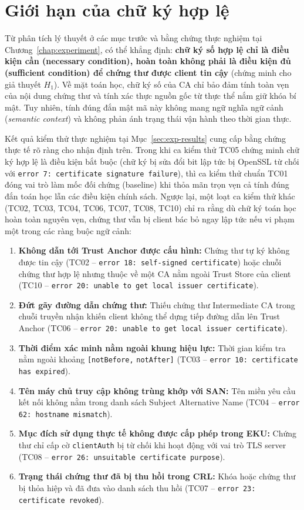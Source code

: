 \section{Giới hạn của chữ ký hợp lệ}
\label{sec:valid-signature-limits}

Từ phân tích lý thuyết ở các mục trước và bằng chứng thực nghiệm tại Chương~\ref{chap:experiment}, có thể khẳng định: \textbf{chữ ký số hợp lệ chỉ là điều kiện cần (necessary condition), hoàn toàn không phải là điều kiện đủ (sufficient condition) để chứng thư được client tin cậy} (chứng minh cho giả thuyết $H_1$). Về mặt toán học, chữ ký số của CA chỉ bảo đảm tính toàn vẹn của nội dung chứng thư và tính xác thực nguồn gốc từ thực thể nắm giữ khóa bí mật. Tuy nhiên, tính đúng đắn mật mã này không mang ngữ nghĩa ngữ cảnh (\textit{semantic context}) và không phản ánh trạng thái vận hành theo thời gian thực.

Kết quả kiểm thử thực nghiệm tại Mục~\ref{sec:exp-results} cung cấp bằng chứng thực tế rõ ràng cho nhận định trên. Trong khi ca kiểm thử TC05 chứng minh chữ ký hợp lệ là điều kiện bắt buộc (chữ ký bị sửa đổi bit lập tức bị OpenSSL từ chối với \texttt{error 7: certificate signature failure}), thì ca kiểm thử chuẩn TC01 đóng vai trò làm mốc đối chứng (baseline) khi thỏa mãn trọn vẹn cả tính đúng đắn toán học lẫn các điều kiện chính sách. Ngược lại, một loạt ca kiểm thử khác (TC02, TC03, TC04, TC06, TC07, TC08, TC10) chỉ ra rằng dù chữ ký toán học hoàn toàn nguyên vẹn, chứng thư vẫn bị client bác bỏ ngay lập tức nếu vi phạm một trong các ràng buộc ngữ cảnh:
\begin{enumerate}\setlength{\itemsep}{1pt}\setlength{\parskip}{0pt}
    \item \textbf{Không dẫn tới Trust Anchor được cấu hình:} Chứng thư tự ký không được tin cậy (TC02 -- \texttt{error 18: self-signed certificate}) hoặc chuỗi chứng thư hợp lệ nhưng thuộc về một CA nằm ngoài Trust Store của client (TC10 -- \texttt{error 20: unable to get local issuer certificate}).
    \item \textbf{Đứt gãy đường dẫn chứng thư:} Thiếu chứng thư Intermediate CA trong chuỗi truyền nhận khiến client không thể dựng tiếp đường dẫn lên Trust Anchor (TC06 -- \texttt{error 20: unable to get local issuer certificate}).
    \item \textbf{Thời điểm xác minh nằm ngoài khung hiệu lực:} Thời gian kiểm tra nằm ngoài khoảng \texttt{[notBefore,} \texttt{notAfter]} (TC03 -- \texttt{error 10: certificate has expired}).
    \item \textbf{Tên máy chủ truy cập không trùng khớp với SAN:} Tên miền yêu cầu kết nối không nằm trong danh sách Subject Alternative Name (TC04 -- \texttt{error 62: hostname mismatch}).
    \item \textbf{Mục đích sử dụng thực tế không được cấp phép trong EKU:} Chứng thư chỉ cấp cờ \texttt{clientAuth} bị từ chối khi hoạt động với vai trò TLS server (TC08 -- \texttt{error 26: unsuitable certificate purpose}).
    \item \textbf{Trạng thái chứng thư đã bị thu hồi trong CRL:} Khóa hoặc chứng thư bị thỏa hiệp và đã đưa vào danh sách thu hồi (TC07 -- \texttt{error 23: certificate revoked}).
\end{enumerate}

